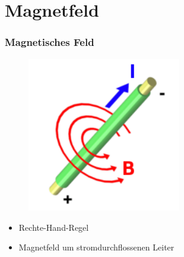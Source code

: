 \section*{Magnetfeld}

\begin{frame}
  \frametitle{Magnetisches Feld}
  \begin{center}
    \begin{figure}
      \includegraphics[width=0.6\textwidth,height=.6\textheight,keepaspectratio]{a08/RechteHand.png}
    \end{figure}
    \begin{itemize}
      \item Rechte-Hand-Regel
      \item Magnetfeld um stromdurchflossenen Leiter
    \end{itemize}
  \end{center}
\end{frame}

